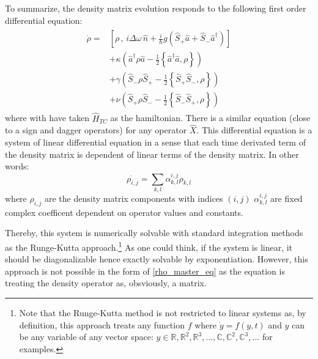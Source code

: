 \documentclass[10pt]{report}
\begin{document}
To summarize, the density matrix evolution responds to the following first order differential equation:
\begin{align}
\label{rho_master_eq}
\begin{split}
\dot{\rho} = &\left[ \rho \, , \, i\Delta\omega\,\hat{n} + \frac{i}{\hbar} g \left(\hat{S}_+ \hat{a} + \hat{S}_-\hat{a}^{\dag} \right)\right]\\
&+ \kappa \left( \hat{a}^\dagger \rho \hat{a} - \frac{1}{2} \left\lbrace \hat{a}^\dagger \hat{a}, \rho \right\rbrace \right)\\
&+ \gamma \left( \hat{S}_- \rho \hat{S}_+ - \frac{1}{2} \left\lbrace \hat{S}_+ \hat{S}_-, \rho \right\rbrace \right)\\
&+ \nu \left( \hat{S}_+ \rho \hat{S}_- - \frac{1}{2} \left\lbrace \hat{S}_- \hat{S}_+, \rho \right\rbrace \right)
\end{split}
\end{align}
where with have taken $\hat{H}_{TC}$ as the hamiltonian. There is a similar equation (close to a sign and dagger operators) for any operator $\hat{X}$. This differential equation is a system of linear differential equation in a sense that each time derivated term of the density matrix is dependent of linear terms of the density matrix. In other words:
\begin{equation}
\dot{\rho_{i,j}} = \sum_{k,l} \alpha_{k,l}^{i,j} \rho_{k,l}
\end{equation}
where $\rho_{i,j}$ are the density matrix components with indices $(i,j)$ $\alpha_{k,l}^{i,j}$ are fixed complex coefficent dependent on operator values and constants. 

Thereby, this system is numerically solvable with standard integration methods as the Runge-Kutta approach.\footnote{Note that the Runge-Kutta method is not restricted to linear systems as, by definition, this approach treats any function $f$ where $\dot{y} = f(y, t)$ and $y$ can be any variable of any vector space: $y \in \mathbb{R}, \mathbb{R}^2, \mathbb{R}^3, ..., \mathbb{C}, \mathbb{C}^2, \mathbb{C}^3, ...$ for examples.} As one could think, if the system is linear, it should be diagonalizable hence exactly solvable by exponentiation. However, this approach is not possible in the form of \eqref{rho_master_eq} as the equation is treating the density operator as, obsviously, a matrix. 
\end{document}
